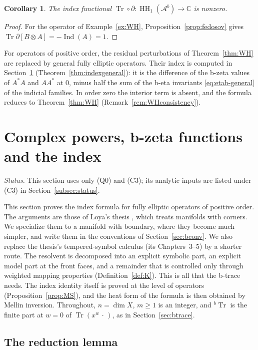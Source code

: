\documentclass[11pt,oneside,reqno]{article}
\DeclareMathOperator{\HH}{HH}
\newcommand{\C}{\mathbb C}
\DeclareMathOperator{\Tr}{Tr}
\newcommand{\Ab}{\mathcal A^b}
\theoremstyle{plain}
\newtheorem{corollary}[theorem]{Corollary}
\theoremstyle{definition}
\theoremstyle{remark}
\begin{document}
\begin{corollary}\label{cor:IF}
The index functional \(\Tr\circ\partial:\HH_1(\Ab)\to\C\) is nonzero.
\end{corollary}

\begin{proof}
For the operator of Example~\ref{ex:WH}, Proposition~\ref{prop:fedosov}
gives \(\Tr\partial[B\otimes A]=-\operatorname{Ind}(A)=1\).
\end{proof}

For operators of positive order, the residual perturbations of
Theorem~\ref{thm:WH} are replaced by general fully elliptic operators.
Their index is computed in Section~\ref{sec:zeta}
(Theorem~\ref{thm:indexgeneral}): it is the difference of the b-zeta values
of \(A^*A\) and \(AA^*\) at \(0\), minus half the sum of the b-eta invariants
\eqref{eq:etab-general} of the indicial families. In order zero the interior
term is absent, and the formula reduces to Theorem~\ref{thm:WH}
(Remark~\ref{rem:WHconsistency}).

\section{Complex powers, b-zeta functions and the index}\label{sec:zeta}

\emph{Status.} This section uses only (Q0) and (C3); its analytic inputs
are listed under (C3) in Section~\ref{subsec:status}.

This section proves the index formula for fully elliptic operators of
positive order. The arguments are those of Loya's thesis
\cite[Chs.~2--8]{LoyaThesis}, which treats manifolds with corners. We
specialize them to a manifold with boundary, where they become much
simpler, and write them in the conventions of Section~\ref{sec:bconv}. We
also replace the thesis's tempered-symbol calculus (its Chapters~3--5) by
a shorter route. The resolvent is decomposed into an explicit symbolic part,
an explicit model part at the front faces, and a remainder that is
controlled only through weighted mapping properties (Definition~\ref{def:K}).
This is all that the b-trace needs. The index identity itself is proved at
the level of operators (Proposition~\ref{prop:MS}), and the heat form of the
formula is then obtained by Mellin inversion. Throughout, \(n=\dim X\),
\(m\geq1\) is an integer, and \({}^b\Tr\) is the finite part at \(w=0\) of
\(\Tr(x^w\,\cdot\,)\), as in Section~\ref{sec:btrace}.

\subsection{The reduction lemma}\label{subsec:reduction}
\end{document}
